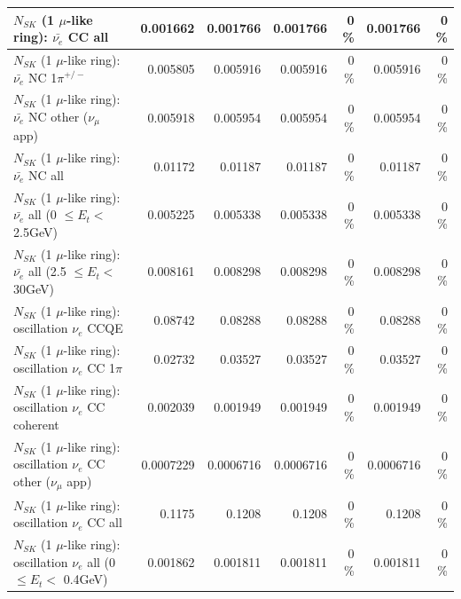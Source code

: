 \begin{table}
\begin{tabular}{| l | r | r | r  r | r  r |}
                            $N_{SK}$ (1 $\mu$-like ring): $\bar{\nu_{e}}$ CC all &        0.001662 &        0.001766 &        0.001766 &        0 \%  &        0.001766 &        0 \%  \\ 
\hline
                     $N_{SK}$ (1 $\mu$-like ring): $\bar{\nu_e}$ NC 1$\pi^{+/-}$ &        0.005805 &        0.005916 &        0.005916 &        0 \%  &        0.005916 &        0 \%  \\ 
            $N_{SK}$ (1 $\mu$-like ring): $\bar{\nu_e}$ NC other ($\nu_\mu$ app) &        0.005918 &        0.005954 &        0.005954 &        0 \%  &        0.005954 &        0 \%  \\ 
                            $N_{SK}$ (1 $\mu$-like ring): $\bar{\nu_{e}}$ NC all &         0.01172 &         0.01187 &         0.01187 &        0 \%  &         0.01187 &        0 \%  \\ 
\hline
     $N_{SK}$ (1 $\mu$-like ring): $\bar{\nu_{e}}$ all (0 $\leq E_{t} <$ 2.5GeV) &        0.005225 &        0.005338 &        0.005338 &        0 \%  &        0.005338 &        0 \%  \\ 
    $N_{SK}$ (1 $\mu$-like ring): $\bar{\nu_{e}}$ all (2.5 $\leq E_{t} <$ 30GeV) &        0.008161 &        0.008298 &        0.008298 &        0 \%  &        0.008298 &        0 \%  \\ 
\hline
\hline
\hline
                          $N_{SK}$ (1 $\mu$-like ring): oscillation $\nu_e$ CCQE &         0.08742 &         0.08288 &         0.08288 &        0 \%  &         0.08288 &        0 \%  \\ 
                     $N_{SK}$ (1 $\mu$-like ring): oscillation $\nu_e$ CC 1$\pi$ &         0.02732 &         0.03527 &         0.03527 &        0 \%  &         0.03527 &        0 \%  \\ 
                   $N_{SK}$ (1 $\mu$-like ring): oscillation $\nu_e$ CC coherent &        0.002039 &        0.001949 &        0.001949 &        0 \%  &        0.001949 &        0 \%  \\ 
      $N_{SK}$ (1 $\mu$-like ring): oscillation $\nu_e$ CC other ($\nu_\mu$ app) &       0.0007229 &       0.0006716 &       0.0006716 &        0 \%  &       0.0006716 &        0 \%  \\ 
                       $N_{SK}$ (1 $\mu$-like ring): oscillation $\nu_e$  CC all &          0.1175 &          0.1208 &          0.1208 &        0 \%  &          0.1208 &        0 \%  \\ 
\hline
$N_{SK}$ (1 $\mu$-like ring): oscillation $\nu_{e}$ all (0 $\leq E_{t} <$ 0.4GeV) &        0.001862 &        0.001811 &        0.001811 &        0 \%  &        0.001811 &        0 \%  \\ 

\end{tabular}
\end{table}
